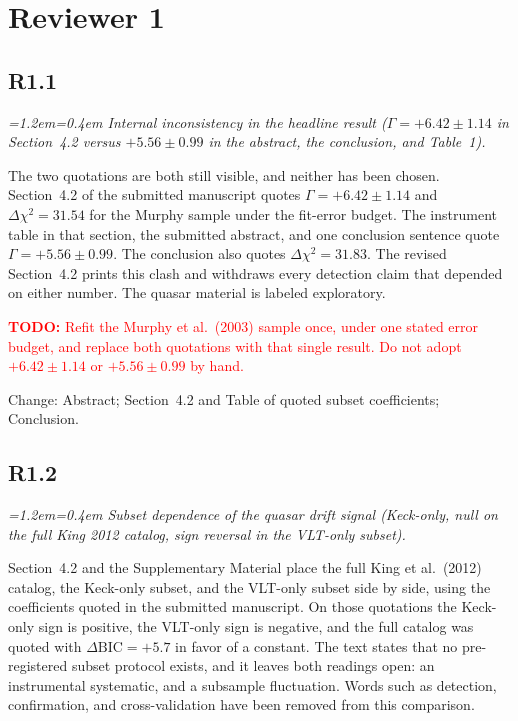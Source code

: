 \documentclass[11pt,a4paper]{article}
\newenvironment{review}{\par\color{revcolor}\itshape\leftskip=1.2em\rightskip=0.4em\noindent}{\par\leftskip=0pt\rightskip=0pt}
\newcommand{\revtodo}[1]{\textcolor{red}{\textbf{TODO:} #1}}
\begin{document}
\section*{Reviewer 1}

\subsection*{R1.1}
\begin{review}
Internal inconsistency in the headline result ($\Gamma = +6.42\pm 1.14$ in Section~4.2 versus $+5.56\pm 0.99$ in the abstract, the conclusion, and Table~1).
\end{review}

The two quotations are both still visible, and neither has been chosen.
Section~4.2 of the submitted manuscript quotes $\Gamma = +6.42\pm 1.14$ and $\Delta\chi^2 = 31.54$ for the Murphy sample under the fit-error budget.
The instrument table in that section, the submitted abstract, and one conclusion sentence quote $\Gamma = +5.56\pm 0.99$.
The conclusion also quotes $\Delta\chi^2 = 31.83$.
The revised Section~4.2 prints this clash and withdraws every detection claim that depended on either number.
The quasar material is labeled exploratory.

\revtodo{Refit the Murphy et al.\ (2003) sample once, under one stated error budget, and replace both quotations with that single result. Do not adopt $+6.42\pm 1.14$ or $+5.56\pm 0.99$ by hand.}

Change: Abstract; Section~4.2 and Table of quoted subset coefficients; Conclusion.

\subsection*{R1.2}
\begin{review}
Subset dependence of the quasar drift signal (Keck-only, null on the full King 2012 catalog, sign reversal in the VLT-only subset).
\end{review}

Section~4.2 and the Supplementary Material place the full King et al.\ (2012) catalog, the Keck-only subset, and the VLT-only subset side by side, using the coefficients quoted in the submitted manuscript.
On those quotations the Keck-only sign is positive, the VLT-only sign is negative, and the full catalog was quoted with $\Delta\mathrm{BIC} = +5.7$ in favor of a constant.
The text states that no pre-registered subset protocol exists, and it leaves both readings open: an instrumental systematic, and a subsample fluctuation.
Words such as detection, confirmation, and cross-validation have been removed from this comparison.
\end{document}
